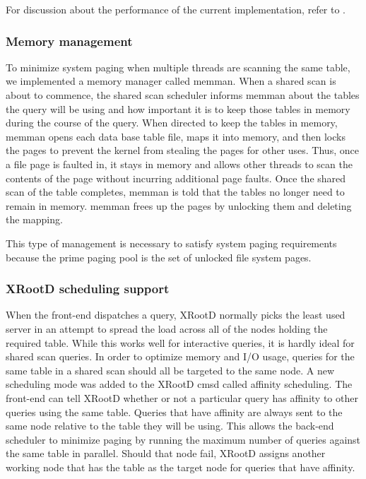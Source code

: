 \documentclass[DM,toc]{lsstdoc}
\begin{document}
For discussion about the performance of the current implementation, refer
to .

\subsubsection{Memory management}\label{shared-scan-memory-management}

To minimize system paging when multiple threads are scanning the same table,
we implemented a memory manager called memman. When a shared scan is about to
commence, the shared scan scheduler informs memman about the tables the query
will be using and how important it is to keep those tables in memory during
the course of the query. When directed to keep the tables in memory, memman
opens each data base table file, maps it into memory, and then locks the pages
to prevent the kernel from stealing the pages for other uses. Thus, once a
file page is faulted in, it stays in memory and allows other threads to scan
the contents of the page without incurring additional page faults. Once the
shared scan of the table completes, memman is told that the tables no longer
need to remain in memory. memman frees up the pages by unlocking them and
deleting the mapping.

This type of management is necessary to satisfy system paging requirements
because the prime paging pool is the set of unlocked file system pages.

\subsubsection{XRootD scheduling support}\label{shared-scan-xrootd-scheduling-support}

When the front-end dispatches a query, XRootD normally picks the least used
server in an attempt to spread the load across all of the nodes holding the
required table. While this works well for interactive queries, it is hardly
ideal for shared scan queries. In order to optimize memory and I/O usage,
queries for the same table in a shared scan should all be targeted to the same
node. A new scheduling mode was added to the XRootD cmsd called affinity
scheduling. The front-end can tell XRootD whether or not a particular query
has affinity to other queries using the same table. Queries that have affinity
are always sent to the same node relative to the table they will be using.
This allows the back-end scheduler to minimize paging by running the maximum
number of queries against the same table in parallel. Should that node fail,
XRootD assigns another working node that has the table as the target node for
queries that have affinity.
\end{document}
